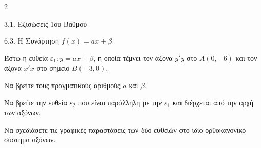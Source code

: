 
\begin{ylh}{2}
    \item 3.1. Εξισώσεις 1ου Βαθμού
    \item 6.3. Η Συνάρτηση $f(x)=ax+\beta$
\end{ylh}
Έστω η ευθεία $\varepsilon_{1}: y = ax + \beta$, η οποία τέμνει τον άξονα $y'y$ στο $A(0, -6)$ και τον άξονα $x'x$ στο σημείο $B(-3, 0)$.
\begin{alist}
\item Να βρείτε τους πραγματικούς αριθμούς $a$ και $\beta$.
\item Να βρείτε την ευθεία $\varepsilon_{2}$ που είναι παράλληλη με την $\varepsilon_{1}$ και διέρχεται από την αρχή των αξόνων.
\item Να σχεδιάσετε τις γραφικές παραστάσεις των δύο ευθειών στο ίδιο ορθοκανονικό σύστημα αξόνων.

\end{alist}

